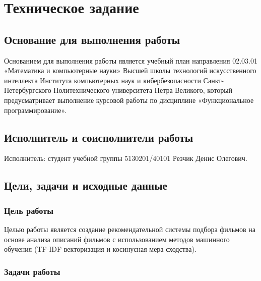 \section{Техническое задание}

\subsection{Основание для выполнения работы}

Основанием для выполнения работы является учебный план направления
02.03.01 «Математика и компьютерные науки» Высшей школы технологий искусственного интеллекта Института компьютерных наук и кибербезопасности
Санкт-Петербургского Политехнического университета Петра Великого,
который предусматривает выполнение курсовой работы по дисциплине
«Функциональное программирование».

\subsection{Исполнитель и соисполнители работы}

Исполнитель: студент учебной группы 5130201/40101 Резчик Денис Олегович.

\subsection{Цели, задачи и исходные данные}

\subsubsection{Цель работы}

Целью работы является создание рекомендательной системы подбора фильмов на основе анализа описаний фильмов с использованием методов машинного обучения (TF-IDF векторизация и косинусная мера сходства).

\subsubsection{Задачи работы}


